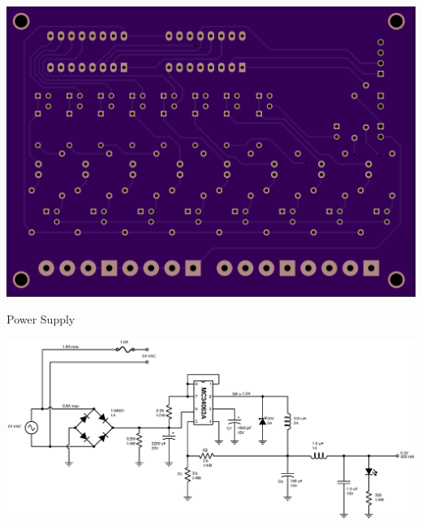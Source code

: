 \documentclass{article}
\begin{document}
\begin{center}
\includegraphics[scale=0.12]{img/pcb-cd-bottom.png}

\end{center}

\pagebreak

\begin{sideways}
\begin{minipage}{\textheight}
\begin{center}


{\fontsize{20}{80}\selectfont Power Supply} \\
\vspace*{0.5in}

\includegraphics[scale=0.85]{../design/xcircuit/power_supply}

\end{center}
\end{minipage}
\end{sideways}

\pagebreak
\end{document}
